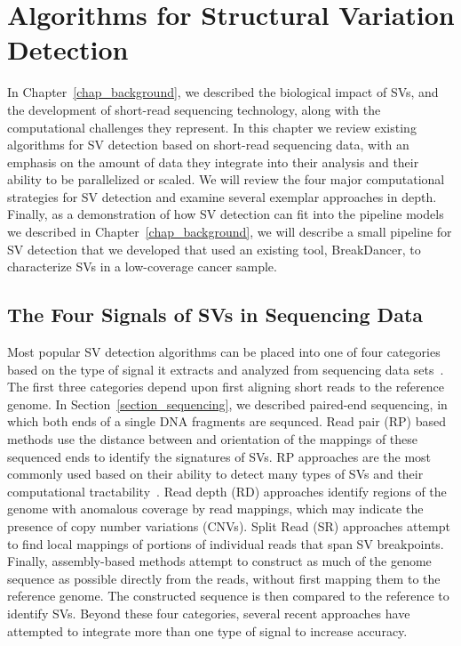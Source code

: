 \chapter{Algorithms for Structural Variation Detection}\label{chap_related_work}

In Chapter~\ref{chap_background}, we described the biological impact of SVs, and the development of short-read sequencing technology, along with the computational challenges they represent. In this chapter we review existing algorithms for SV detection based on short-read sequencing data, with an emphasis on the amount of data they integrate into their analysis and their ability to be parallelized or scaled. We will review the four major computational strategies for SV detection and examine several exemplar approaches in depth. Finally, as a demonstration of how SV detection can fit into the pipeline models we described in Chapter~\ref{chap_background}, we will describe a small pipeline for SV detection that we developed that used an existing tool, BreakDancer, to characterize SVs in a low-coverage cancer sample. 

\section{The Four Signals of SVs in Sequencing Data}

Most popular SV detection algorithms can be placed into one of four categories based on the type of signal it extracts and analyzed from sequencing data sets~\cite{Alkan:2011p547,Koboldt:2012gj}. The first three categories depend upon first aligning short reads to the reference genome. In Section~\ref{section_sequencing}, we described paired-end sequencing, in which both ends of a single DNA fragments are sequnced. Read pair (RP) based methods use the distance between and orientation of the mappings of these sequenced ends to identify the signatures of SVs. RP approaches are the most commonly used based on their ability to detect many types of SVs and their computational tractability~\cite{Alkan:2011p547}. Read depth (RD) approaches identify regions of the genome with anomalous coverage by read mappings, which may indicate the presence of copy number variations (CNVs). Split Read (SR) approaches attempt to find local mappings of portions of individual reads that span SV breakpoints. Finally, assembly-based methods attempt to construct as much of the genome sequence as possible directly from the reads, without first mapping them to the reference genome. The constructed sequence is then compared to the reference to identify SVs. Beyond these four categories, several recent approaches have attempted to integrate more than one type of signal to increase accuracy. 

